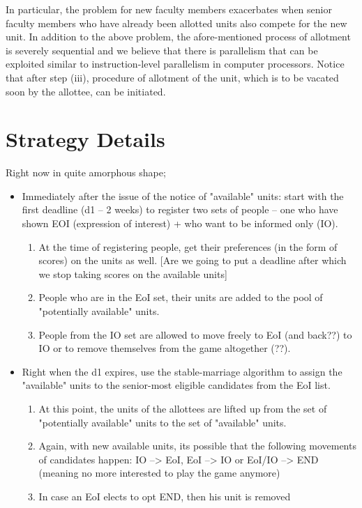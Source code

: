 \documentclass[a4paper,10pt]{article}
\begin{document}
%
In particular, the problem for new faculty members exacerbates when
senior faculty members who have already been allotted units also
compete for the new unit.
%
In addition to the above problem, the afore-mentioned process of
allotment is severely sequential and we believe that there is
parallelism that can be exploited similar to instruction-level
parallelism in computer processors. Notice that after step (iii),
procedure of allotment of the unit, which is to be vacated soon by the
allottee, can be initiated.


\section{Strategy Details}
Right now in quite amorphous shape;

\begin{itemize}
\item Immediately after the issue of the notice of "available" units: 
  start with the first deadline (d1 -- 2 weeks) to register 
  two sets of people -- one who have shown EOI (expression of
  interest)  +  who want to be informed
  only (IO).
  \begin{enumerate}
  \item At the time of registering people, get their preferences (in the
    form of scores) on the units as well. [Are we going to put a
      deadline after which we stop taking scores on the available units]
  \item People who are in the EoI set, their units are added to the pool of 
    "potentially available" units.
  \item People from the IO set are allowed to move freely to 
    EoI (and back??) to IO or to remove themselves from the game altogether (??).
  \end{enumerate}
\item Right when the d1 expires, use the stable-marriage algorithm to assign 
  the "available" units to the senior-most eligible candidates from the 
  EoI list.
  \begin{enumerate}
  \item At this point, the units of the allottees are lifted up from the
    set of "potentially available" units to the set of "available"
    units.
  \item Again, with new available units, its possible that the
    following movements of candidates happen: IO --> EoI, EoI --> IO
    or EoI/IO --> END (meaning no more interested to play the game
    anymore)
  \item In case an EoI elects to opt END, then his unit is removed

\end{enumerate}
\end{itemize}
\end{document}

